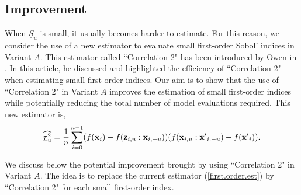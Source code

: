 \subsection{Improvement}
\label{sec:4.2}

When $\underline{S}_u$ is small, it usually becomes harder to estimate. For this reason, we consider the use of a new estimator to evaluate small first-order Sobol' indices in Variant $A$. This estimator called ``Correlation 2" has been introduced by Owen in \cite{Owen}. In this article, he discussed and highlighted the efficiency of ``Correlation 2" when estimating small first-order indices. Our aim is to show that the use of ``Correlation 2" in Variant $A$ {\color{purple}  improves the estimation of small first-order indices while potentially reducing the total number of model evaluations required.} This new estimator is,
\begin{equation*}
\widehat{\underline{\tau}_u^2} = \frac{1}{n} \sum \limits_{i=0}^{n-1} (f(\boldsymbol{\mathbf{x}}_i)-f({\boldsymbol{\mathbf{z}}}_{i,u}:{\boldsymbol{\mathbf{x}}}_{i,-u}))(f(\boldsymbol{\mathbf{x}}_{i,u}:{\boldsymbol{\mathbf{x}}'}_{i,-u})-f({\boldsymbol{\mathbf{x}}'}_i)).
\end{equation*}
\bigskip

We discuss below the potential improvement brought by using ``Correlation 2" in Variant $A$. The idea is to replace the current estimator (\ref{first.order.est}) by  ``Correlation 2" for each small first-order index. 

